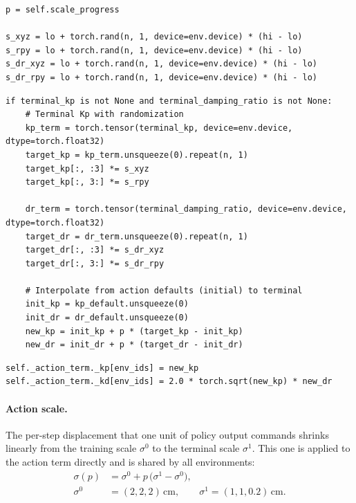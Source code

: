 \begin{snippetbox}[11]
\begin{lstlisting}[firstnumber=1862]
p = self.scale_progress

s_xyz = lo + torch.rand(n, 1, device=env.device) * (hi - lo)
s_rpy = lo + torch.rand(n, 1, device=env.device) * (hi - lo)
s_dr_xyz = lo + torch.rand(n, 1, device=env.device) * (hi - lo)
s_dr_rpy = lo + torch.rand(n, 1, device=env.device) * (hi - lo)
\end{lstlisting}
\snippetelide
\begin{lstlisting}[firstnumber=1872]
if terminal_kp is not None and terminal_damping_ratio is not None:
    # Terminal Kp with randomization
    kp_term = torch.tensor(terminal_kp, device=env.device, dtype=torch.float32)
    target_kp = kp_term.unsqueeze(0).repeat(n, 1)
    target_kp[:, :3] *= s_xyz
    target_kp[:, 3:] *= s_rpy

    dr_term = torch.tensor(terminal_damping_ratio, device=env.device, dtype=torch.float32)
    target_dr = dr_term.unsqueeze(0).repeat(n, 1)
    target_dr[:, :3] *= s_dr_xyz
    target_dr[:, 3:] *= s_dr_rpy

    # Interpolate from action defaults (initial) to terminal
    init_kp = kp_default.unsqueeze(0)
    init_dr = dr_default.unsqueeze(0)
    new_kp = init_kp + p * (target_kp - init_kp)
    new_dr = init_dr + p * (target_dr - init_dr)
\end{lstlisting}
\snippetelide
\begin{lstlisting}[firstnumber=1898]
self._action_term._kp[env_ids] = new_kp
self._action_term._kd[env_ids] = 2.0 * torch.sqrt(new_kp) * new_dr
\end{lstlisting}
\end{snippetbox}

\paragraph{Action scale.} The per-step displacement that one unit of policy output commands shrinks linearly from the training scale $\sigma^0$ to the terminal scale $\sigma^1$. This one is applied to the action term directly and is shared by all environments:
\begin{equation}
\begin{aligned}
  \sigma(p) &= \sigma^0 + p\,\big(\sigma^1 - \sigma^0\big),\\
  \sigma^0 &= (2,2,2)\,\mathrm{cm}, \qquad \sigma^1 = (1,1,0.2)\,\mathrm{cm}.
\end{aligned}
\end{equation}

